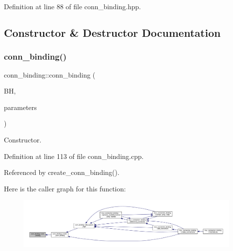 Definition at line 88 of file conn\+\_\+binding.\+hpp.



\subsection{Constructor \& Destructor Documentation}
\mbox{\label{classconn__binding_aa06a50cd09bec55b1e4d968963abaf55}} 
\subsubsection{\texorpdfstring{conn\+\_\+binding()}{conn\_binding()}}
{\footnotesize\ttfamily conn\+\_\+binding\+::conn\+\_\+binding (\begin{DoxyParamCaption}\item[{const \hyperlink{behavioral__helper_8hpp_aae973b54cac87eef3b27442aa3e1e425}{Behavioral\+Helper\+Const\+Ref}}]{BH,  }\item[{const \hyperlink{Parameter_8hpp_a37841774a6fcb479b597fdf8955eb4ea}{Parameter\+Const\+Ref}}]{parameters }\end{DoxyParamCaption})}



Constructor. 



Definition at line 113 of file conn\+\_\+binding.\+cpp.



Referenced by create\+\_\+conn\+\_\+binding().

Here is the caller graph for this function\+:
\nopagebreak
\begin{figure}[H]
\begin{center}
\leavevmode
\includegraphics[width=350pt]{d2/db1/classconn__binding_aa06a50cd09bec55b1e4d968963abaf55_icgraph}
\end{center}
\end{figure}
\mbox{\label{classconn__binding_ae2443ca6da548b0dbbabbdc9253c4d1e}} 
